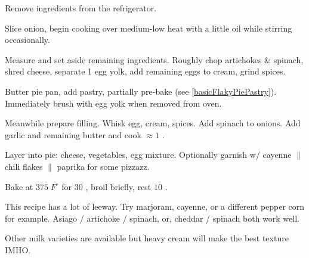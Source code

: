 \begin{preparation}
\item Remove ingredients from the refrigerator.

\item Slice onion, begin cooking over medium-low heat with a little oil while stirring occasionally.

\item Measure and set aside remaining ingredients. Roughly chop artichokes \& spinach, shred cheese, separate 1 egg yolk, add remaining eggs to cream, grind spices.

\item Butter pie pan, add pastry, partially pre-bake (see \ref{basicFlakyPiePastry}). Immediately brush with egg yolk when removed from oven.

\item Meanwhile prepare filling. Whisk egg, cream, spices. Add spinach to onions. Add garlic and remaining butter and cook $\approx 1$ \minute.

\item Layer into pie: cheese, vegetables, egg mixture. Optionally garnish w/ cayenne $\|$ chili flakes $\|$ paprika for some pizzazz.

\item Bake at $375\; F^\circ$ for $30$ \minute, broil briefly, rest $10$ \minute.
\end{preparation}


\begin{variation}
\item This recipe has a lot of leeway. Try marjoram, cayenne, or a different pepper corn for example. Asiago / artichoke / spinach, or, cheddar / spinach both work well.
\item Other milk varieties are available but heavy cream will make the best texture IMHO.
\end{variation}


\recipeend
